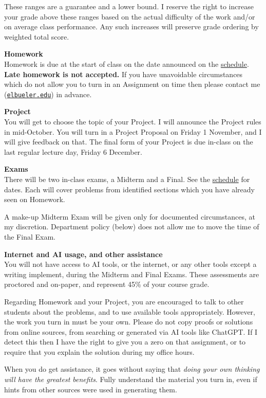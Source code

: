 \documentclass[12pt]{article}
\renewcommand{\emph}[1]{\textsf{\textbf{#1}}}
\newcommand{\localhead}[1]{\par\smallskip\textbf{#1} \smallskip\nobreak\\}%
\def\heading#1{\localhead{\large\emph{#1}}}
\begin{document}
These ranges are a guarantee and a lower bound.  I reserve the right to increase your grade above these ranges based on the actual difficulty of the work and/or on average class performance.  Any such increases will preserve grade ordering by weighted total score.

\heading{Homework}
Homework is due at the start of class on the date announced on the \href{https://bueler.github.io/numerical/assets/general/F24/schedule.pdf}{schedule}.  \emph{Late homework is not accepted.}  If you have unavoidable circumstances which do not allow you to turn in an Assignment on time then please contact me (\href{mailto:elbueler@alaska.edu}{\texttt{elbueler\@@alaska.edu}}) in advance. 

\heading{Project}
You will get to choose the topic of your Project.  I will announce the Project rules in mid-October.  You will turn in a Project Proposal on Friday 1 November, and I will give feedback on that.  The final form of your Project is due in-class on the last regular lecture day, Friday 6 December.

\heading{Exams}
There will be two in-class exams, a Midterm and a Final.  See the \href{https://bueler.github.io/numerical/assets/general/F24/schedule.pdf}{schedule} for dates.  Each will cover problems from identified sections which you have already seen on Homework.

A make-up Midterm Exam will be given only for documented circumstances, at my discretion.  Department policy (below) does not allow me to move the time of the Final Exam.

\heading{Internet and AI usage, and other assistance}
You will not have access to AI tools, or the internet, or any other tools except a writing implement, during the Midterm and Final Exams.  These assessments are proctored and on-paper, and represent 45\% of your course grade.

Regarding Homework and your Project, you are encouraged to talk to other students about the problems, and to use available tools appropriately.  However, the work you turn in must be your own.  Please do not copy proofs or solutions from online sources, from searching or generated via AI tools like ChatGPT.  If I detect this then I have the right to give you a zero on that assignment, or to require that you explain the solution during my office hours.

When you do get assistance, it goes without saying that \textsl{doing your own thinking will have the greatest benefits}.  Fully understand the material you turn in, even if hints from other sources were used in generating them.
\end{document}
